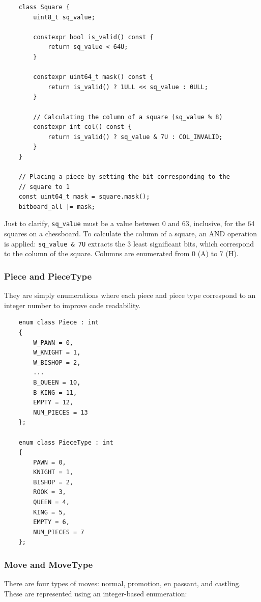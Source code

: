 \begin{lstlisting}
    class Square {
        uint8_t sq_value;

        constexpr bool is_valid() const {
            return sq_value < 64U;
        }

        constexpr uint64_t mask() const {
            return is_valid() ? 1ULL << sq_value : 0ULL;
        }

        // Calculating the column of a square (sq_value % 8)
        constexpr int col() const {
            return is_valid() ? sq_value & 7U : COL_INVALID;
        }
    }

    // Placing a piece by setting the bit corresponding to the
    // square to 1
    const uint64_t mask = square.mask();
    bitboard_all |= mask;
\end{lstlisting}

\noindent Just to clarify, \texttt{sq\_value} must be a value between $0$ and $63$, inclusive, for the 64 squares on a chessboard. To calculate the column of a square, an AND operation is applied: \texttt{sq\_value \& 7U} extracts the 3 least significant bits, which correspond to the column of the square. Columns are enumerated from $0$ (A) to $7$ (H).

\subsubsection{Piece and PieceType}

They are simply enumerations where each piece and piece type correspond to an integer number to improve code readability.

\begin{lstlisting}
    enum class Piece : int
    {
        W_PAWN = 0,
        W_KNIGHT = 1,
        W_BISHOP = 2,
        ...
        B_QUEEN = 10,
        B_KING = 11,
        EMPTY = 12,
        NUM_PIECES = 13
    };

    enum class PieceType : int
    {
        PAWN = 0,
        KNIGHT = 1,
        BISHOP = 2,
        ROOK = 3,
        QUEEN = 4,
        KING = 5,
        EMPTY = 6,
        NUM_PIECES = 7
    };
\end{lstlisting}

\subsubsection{Move and MoveType}

There are four types of moves: normal, promotion, en passant, and castling. These are represented using an integer-based enumeration:


